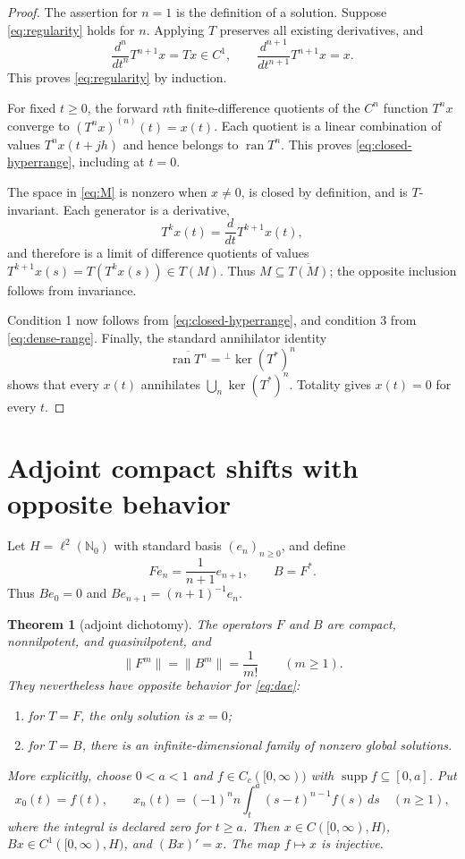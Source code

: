 \documentclass[11pt]{article}
\newtheorem{theorem}{Theorem}
\newcommand{\N}{\mathbb N}
\DeclareMathOperator{\ran}{ran}
\DeclareMathOperator{\supp}{supp}
\begin{document}
\begin{proof}
The assertion for $n=1$ is the definition of a solution.  Suppose
\eqref{eq:regularity} holds for $n$.  Applying $T$ preserves all existing
derivatives, and
\[
 \frac{d^n}{dt^n}T^{n+1}x=Tx\in C^1,
 \qquad \frac{d^{n+1}}{dt^{n+1}}T^{n+1}x=x.
\]
This proves \eqref{eq:regularity} by induction.

For fixed $t\geq0$, the forward $n$th finite-difference quotients of the
$C^n$ function $T^n x$ converge to
$(T^n x)^{(n)}(t)=x(t)$.  Each quotient is a linear combination of values
$T^n x(t+jh)$ and hence belongs to $\ran T^n$.  This proves
\eqref{eq:closed-hyperrange}, including at $t=0$.

The space in \eqref{eq:M} is nonzero when $x\ne0$, is closed by definition,
and is $T$-invariant.  Each generator is a derivative,
\[
 T^k x(t)=\frac{d}{dt}T^{k+1}x(t),
\]
and therefore is a limit of difference quotients of values
$T^{k+1}x(s)=T(T^k x(s))\in T(M)$.  Thus $M\subseteq\overline{T(M)}$; the
opposite inclusion follows from invariance.

Condition 1 now follows from \eqref{eq:closed-hyperrange}, and condition 3
from \eqref{eq:dense-range}.  Finally, the standard annihilator identity
\[
 \overline{\ran T^n}={}^{\perp}\!\ker (T^*)^n
\]
shows that every $x(t)$ annihilates
$\bigcup_n\ker (T^*)^n$.  Totality gives $x(t)=0$ for every $t$.
\end{proof}

\section{Adjoint compact shifts with opposite behavior}

Let $H=\ell^2(\N_0)$ with standard basis $(e_n)_{n\geq0}$, and define
\begin{equation}\label{eq:shifts}
 Fe_n=\frac1{n+1}e_{n+1},\qquad B=F^*.
\end{equation}
Thus $Be_0=0$ and $Be_{n+1}=(n+1)^{-1}e_n$.

\begin{theorem}[adjoint dichotomy]\label{thm:shifts}
The operators $F$ and $B$ are compact, nonnilpotent, and quasinilpotent, and
\begin{equation}\label{eq:powers}
 \|F^m\|=\|B^m\|=\frac1{m!}\qquad(m\geq1).
\end{equation}
They nevertheless have opposite behavior for \eqref{eq:dae}:
\begin{enumerate}
 \item for $T=F$, the only solution is $x=0$;
 \item for $T=B$, there is an infinite-dimensional family of nonzero global
       solutions.
\end{enumerate}
More explicitly, choose $0<a<1$ and
$f\in C_c([0,\infty))$ with $\supp f\subseteq[0,a]$.  Put
\begin{equation}\label{eq:explicit}
 x_0(t)=f(t),\qquad
 x_n(t)=(-1)^n n\int_t^a(s-t)^{n-1}f(s)\,ds\quad(n\geq1),
\end{equation}
where the integral is declared zero for $t\geq a$.  Then
$x\in C([0,\infty),H)$, $Bx\in C^1([0,\infty),H)$, and $(Bx)'=x$.
The map $f\mapsto x$ is injective.
\end{theorem}
\end{document}
